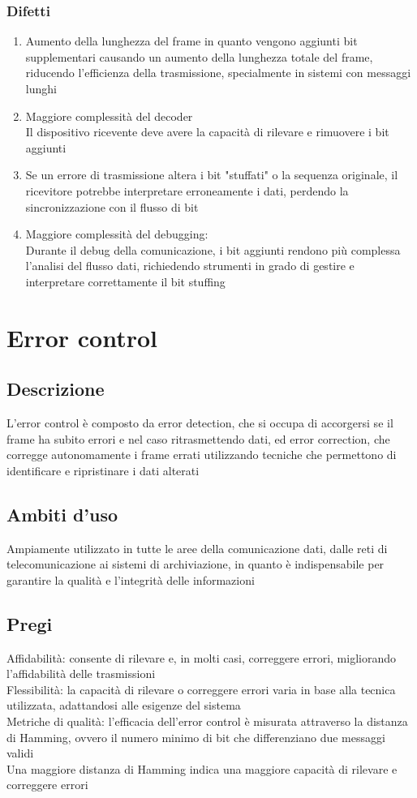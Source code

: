 \documentclass[10pt,oneside,a4paper]{article}
\begin{document}
\subsubsection{Difetti}
\begin{enumerate}
\item Aumento della lunghezza del frame in quanto vengono aggiunti bit supplementari causando un aumento della lunghezza totale del frame, riducendo l'efficienza della trasmissione, specialmente in sistemi con messaggi lunghi
\item Maggiore complessità del decoder\\
Il dispositivo ricevente deve avere la capacità di rilevare e rimuovere i bit aggiunti
\item Se un errore di trasmissione altera i bit "stuffati" o la sequenza originale, il ricevitore potrebbe interpretare erroneamente i dati, perdendo la sincronizzazione con il flusso di bit
\item Maggiore complessità del debugging:\\
Durante il debug della comunicazione, i bit aggiunti rendono più complessa l'analisi del flusso dati, richiedendo strumenti in grado di gestire e interpretare correttamente il bit stuffing
\end{enumerate}
\section{Error control}
\subsection{Descrizione}
L'error control è composto da error detection, che si occupa di accorgersi se il frame ha subito errori e nel caso ritrasmettendo dati, ed error correction, che corregge autonomamente i frame errati utilizzando tecniche che permettono di identificare e ripristinare i dati alterati
\subsection{Ambiti d'uso}
Ampiamente utilizzato in tutte le aree della comunicazione dati, dalle reti di telecomunicazione ai sistemi di archiviazione, in quanto è indispensabile per garantire la qualità e l'integrità delle informazioni
\subsection{Pregi}
Affidabilità: consente di rilevare e, in molti casi, correggere errori, migliorando l'affidabilità delle trasmissioni\\
Flessibilità: la capacità di rilevare o correggere errori varia in base alla tecnica utilizzata, adattandosi alle esigenze del sistema\\
Metriche di qualità: l'efficacia dell'error control è misurata attraverso la distanza di Hamming, ovvero il numero minimo di bit che differenziano due messaggi validi\\
Una maggiore distanza di Hamming indica una maggiore capacità di rilevare e correggere errori
\end{document}
